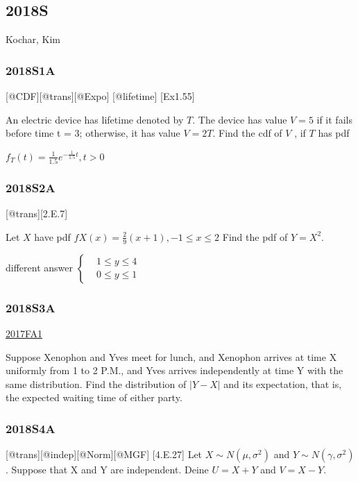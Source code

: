 \documentclass[6pt,twocolumn,Portrait]{article}
\begin{document}
\hypertarget{s-11}{%
\subsection{2018S}\label{s-11}}

Kochar, Kim

\hypertarget{s1a-1}{%
\subsubsection{2018S1A}\label{s1a-1}}

{[}@CDF{]}{[}@trans{]}{[}@Expo{]} {[}@lifetime{]} {[}Ex1.55{]}

An electric device has lifetime denoted by \(T\). The device has value
\(V=5\) if it fails before time t = 3; otherwise, it has value
\(V = 2T\). Find the cdf of \(V\) , if \(T\) has pdf

\(f_T(t)=\frac1{1.5}e^{-\frac1{1.5}t}, t>0\)

\hypertarget{s2a-2}{%
\subsubsection{2018S2A}\label{s2a-2}}

{[}@trans{]}{[}2.E.7{]}

Let \(X\) have pdf \(fX(x)=\frac29(x+1), -1\le x\le2\) Find the pdf of
\(Y=X^2\).

{ different answer \(\begin{cases}&1\le y\le4\\& 0\le y\le1\end{cases}\)
}

\hypertarget{s3a-2}{%
\subsubsection{2018S3A}\label{s3a-2}}

\protect\hyperlink{fa1-3}{2017FA1}

Suppose Xenophon and Yves meet for lunch, and Xenophon arrives at time X
uniformly from 1 to 2 P.M., and Yves arrives independently at time Y
with the same distribution. Find the distribution of \(|Y-X|\) and its
expectation, that is, the expected waiting time of either party.

\hypertarget{s4a-2}{%
\subsubsection{2018S4A}\label{s4a-2}}

{[}@trans{]}{[}@indep{]}{[}@Norm{]}{[}@MGF{]} {[}4.E.27{]} Let
\(X\sim N(\mu,\sigma^2)\) and \(Y\sim N(\gamma,\sigma^2)\). Suppose that
X and Y are independent. Deine \(U=X+Y\) and \(V=X-Y\).
\end{document}

